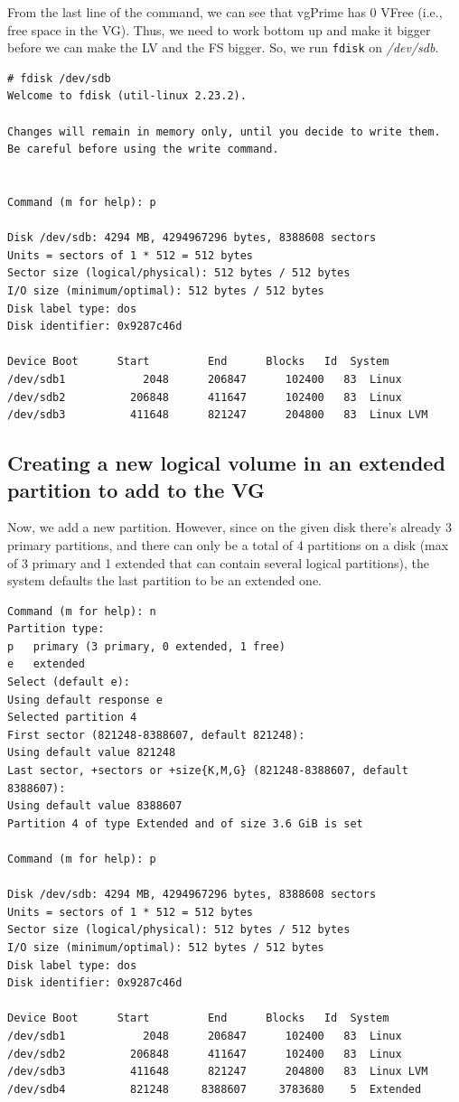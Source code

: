 \noindent
From the last line of the command, we can see that vgPrime has 0 VFree (i.e., free space in the VG). Thus, we need to work bottom up and make it bigger before we can make the LV and the FS bigger. So, we run \verb|fdisk| on \textit{/dev/sdb}.

\vspace{-15pt}
\begin{verbatim}
# fdisk /dev/sdb
Welcome to fdisk (util-linux 2.23.2).

Changes will remain in memory only, until you decide to write them.
Be careful before using the write command.


Command (m for help): p

Disk /dev/sdb: 4294 MB, 4294967296 bytes, 8388608 sectors
Units = sectors of 1 * 512 = 512 bytes
Sector size (logical/physical): 512 bytes / 512 bytes
I/O size (minimum/optimal): 512 bytes / 512 bytes
Disk label type: dos
Disk identifier: 0x9287c46d

Device Boot      Start         End      Blocks   Id  System
/dev/sdb1            2048      206847      102400   83  Linux
/dev/sdb2          206848      411647      102400   83  Linux
/dev/sdb3          411648      821247      204800   83  Linux LVM
\end{verbatim}
\vspace{-10pt}

\subsection{Creating a new logical volume in an extended partition to add to the VG}
Now, we add a new partition. However, since on the given disk there's already 3 primary partitions, and there can only be a total of 4 partitions on a disk (max of 3 primary and 1 extended that can contain several logical partitions), the system defaults the last partition to be an extended one. 

\vspace{-15pt}
\begin{verbatim}
Command (m for help): n
Partition type:
p   primary (3 primary, 0 extended, 1 free)
e   extended
Select (default e): 
Using default response e
Selected partition 4
First sector (821248-8388607, default 821248): 
Using default value 821248
Last sector, +sectors or +size{K,M,G} (821248-8388607, default 8388607): 
Using default value 8388607
Partition 4 of type Extended and of size 3.6 GiB is set

Command (m for help): p

Disk /dev/sdb: 4294 MB, 4294967296 bytes, 8388608 sectors
Units = sectors of 1 * 512 = 512 bytes
Sector size (logical/physical): 512 bytes / 512 bytes
I/O size (minimum/optimal): 512 bytes / 512 bytes
Disk label type: dos
Disk identifier: 0x9287c46d

Device Boot      Start         End      Blocks   Id  System
/dev/sdb1            2048      206847      102400   83  Linux
/dev/sdb2          206848      411647      102400   83  Linux
/dev/sdb3          411648      821247      204800   83  Linux LVM
/dev/sdb4          821248     8388607     3783680    5  Extended
\end{verbatim}
\vspace{-10pt}

